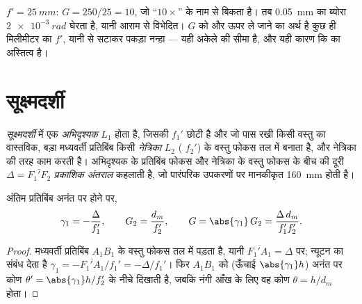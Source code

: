 \begin{example}[घड़ीसाज़ का आवर्धक]\label{ex:b1:optical-instruments:loupe}
$f' = \qty{25}{mm}$: $G = 250/25 = 10$, जो ``$10\times$'' के नाम से बिकता
है। तब \qty{0.05}{mm} का ब्योरा $\qty{2e-3}{rad}$ घेरता है, यानी आराम से
विभेदित। $G$ को और ऊपर ले जाने का अर्थ है कुछ ही मिलीमीटर का $f'$, यानी 
से सटाकर पकड़ा नन्हा  --- यही अकेले  की सीमा है, और यही कारण कि
 का अस्तित्व है।
\end{example}

\section{सूक्ष्मदर्शी}

\begin{definition}[संयुक्त सूक्ष्मदर्शी]\label{def:b1:optical-instruments:microscope}
\emph{सूक्ष्मदर्शी} में एक \emph{अभिदृश्यक} $L_1$ होता है, जिसकी 
$f_1'$ छोटी है और जो पास रखी किसी वस्तु का वास्तविक, बड़ा मध्यवर्ती प्रतिबिंब किसी
\emph{नेत्रिका} $L_2$ (
$f_2'$) के वस्तु फोकस तल में बनाता है, और नेत्रिका  की तरह काम करती है।
अभिदृश्यक के प्रतिबिंब फोकस और नेत्रिका के वस्तु फोकस के बीच की दूरी $\Delta =
\overline{F_1'F_2}$ \emph{प्रकाशिक अंतराल} कहलाती है, जो पारंपरिक उपकरणों पर
मानकीकृत \qty{160}{mm} होती है।
\end{definition}

\begin{proposition}\label{prop:b1:optical-instruments:microscope}
अंतिम प्रतिबिंब अनंत पर होने पर,
\[
\gamma_1 = -\frac{\Delta}{f_1'}, \qquad G_2 = \frac{d_m}{f_2'},
\qquad G = \abs{\gamma_1}\,G_2 = \frac{\Delta\,d_m}{f_1' f_2'} .
\]
\end{proposition}

\begin{proof}
मध्यवर्ती प्रतिबिंब $A_1B_1$  के वस्तु फोकस तल में पड़ता है, यानी
$\overline{F_1'A_1} = \Delta$ पर; न्यूटन का संबंध देता है
$\gamma_1 = -\overline{F_1'A_1}/f_1' = -\Delta/f_1'$। फिर 
$A_1B_1$ को (ऊँचाई $\abs{\gamma_1} h$) अनंत पर कोण
$\theta' = \abs{\gamma_1} h/f_2'$ के नीचे दिखाती है, जबकि नंगी आँख के लिए वह
कोण $\theta = h/d_m$ होता।
\end{proof}

